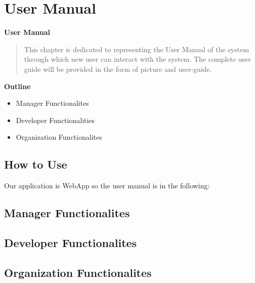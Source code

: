 \section{User Manual}

\vspace{20mm}


\Huge{\textbf{User Manual}}

\vspace{20mm}


\begin{abstract}

    This chapter is dedicated to representing the User Manual of the system
    through which new user can interact with the system. The complete user guide
    will be provided in the form of picture and user-guide.



\end{abstract}

\vspace{20mm}

\large{\textbf{Outline}}

\begin{center}
    \begin{itemize}
        \item Manager Functionalites
        \item Developer Functionalities
        \item Organization Functionalites
    \end{itemize}
\end{center}
\pagebreak

\subsection*{How to Use}
Our application is WebApp so the user manual is in the following:

\subsection{Manager Functionalites}


\subsection{Developer Functionalites}


\subsection{Organization Functionalites}


